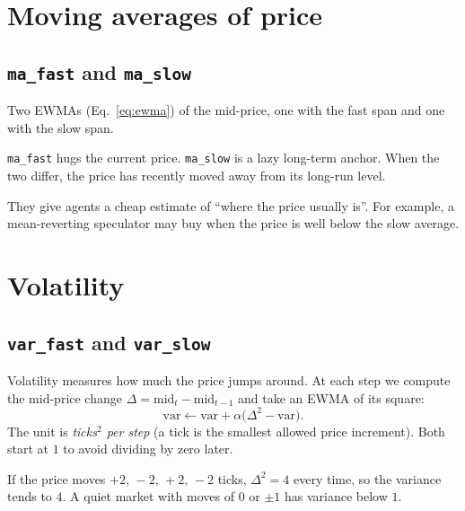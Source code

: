 \documentclass[11pt,a4paper]{article}
\newcommand{\code}[1]{\texttt{#1}}
\begin{document}
\section{Moving averages of price}

\subsection{\code{ma\_fast} and \code{ma\_slow}}
Two EWMAs (Eq.~\ref{eq:ewma}) of the mid-price, one with the fast span and one with the slow span.

\begin{intuition}
\code{ma\_fast} hugs the current price. \code{ma\_slow} is a lazy long-term anchor. When the two
differ, the price has recently moved away from its long-run level.
\end{intuition}

\begin{whyuse}
They give agents a cheap estimate of ``where the price usually is''. For example, a mean-reverting
speculator may buy when the price is well below the slow average.
\end{whyuse}

\section{Volatility}

\subsection{\code{var\_fast} and \code{var\_slow}}
Volatility measures how much the price jumps around. At each step we compute the mid-price change
$\Delta = \text{mid}_t - \text{mid}_{t-1}$ and take an EWMA of its square:
\[
  \text{var} \leftarrow \text{var} + \alpha\bigl(\Delta^2 - \text{var}\bigr).
\]
The unit is \emph{ticks$^2$ per step} (a tick is the smallest allowed price increment). Both start
at $1$ to avoid dividing by zero later.

\begin{example}
If the price moves $+2,\,-2,\,+2,\,-2$ ticks, $\Delta^2=4$ every time, so the variance tends to $4$.
A quiet market with moves of $0$ or $\pm1$ has variance below $1$.
\end{example}
\end{document}

